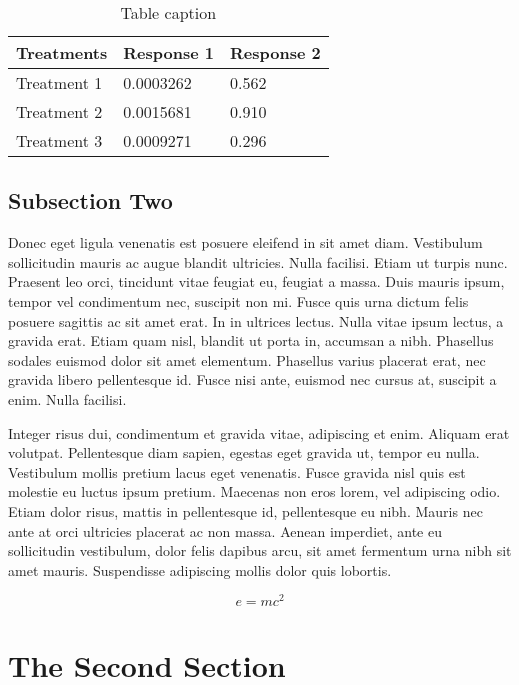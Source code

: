 \documentclass[preprint,12pt,times]{elsarticle}
\begin{document}
	\begin{table}[h]
		\centering
		\begin{tabular}{l l l}
			\hline
			\textbf{Treatments} & \textbf{Response 1} & \textbf{Response 2}\\
			\hline
			Treatment 1 & 0.0003262 & 0.562 \\
			Treatment 2 & 0.0015681 & 0.910 \\
			Treatment 3 & 0.0009271 & 0.296 \\
			\hline
		\end{tabular}
		\caption{Table caption}
	\end{table}

	\subsection{Subsection Two}

	Donec eget ligula venenatis est posuere eleifend in sit amet diam. Vestibulum sollicitudin mauris ac augue blandit ultricies. Nulla facilisi. Etiam ut turpis nunc. Praesent leo orci, tincidunt vitae feugiat eu, feugiat a massa. Duis mauris ipsum, tempor vel condimentum nec, suscipit non mi. Fusce quis urna dictum felis posuere sagittis ac sit amet erat. In in ultrices lectus. Nulla vitae ipsum lectus, a gravida erat. Etiam quam nisl, blandit ut porta in, accumsan a nibh. Phasellus sodales euismod dolor sit amet elementum. Phasellus varius placerat erat, nec gravida libero pellentesque id. Fusce nisi ante, euismod nec cursus at, suscipit a enim. Nulla facilisi.



	Integer risus dui, condimentum et gravida vitae, adipiscing et enim. Aliquam erat volutpat. Pellentesque diam sapien, egestas eget gravida ut, tempor eu nulla. Vestibulum mollis pretium lacus eget venenatis. Fusce gravida nisl quis est molestie eu luctus ipsum pretium. Maecenas non eros lorem, vel adipiscing odio. Etiam dolor risus, mattis in pellentesque id, pellentesque eu nibh. Mauris nec ante at orci ultricies placerat ac non massa. Aenean imperdiet, ante eu sollicitudin vestibulum, dolor felis dapibus arcu, sit amet fermentum urna nibh sit amet mauris. Suspendisse adipiscing mollis dolor quis lobortis.

	\begin{equation}
	\label{eq:emc}
	e = mc^2
	\end{equation}

	\section{The Second Section}
	\label{S:3}
\end{document}
